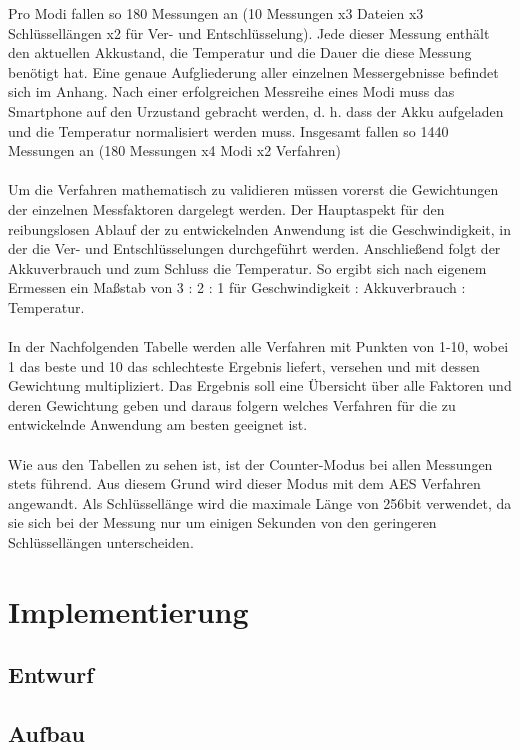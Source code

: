 \documentclass[10pt, a4paper]{scrreprt}
\begin{document}
Pro Modi fallen so 180 Messungen an (10 Messungen x3 Dateien x3 Schlüssellängen x2 für Ver- und Entschlüsselung). Jede dieser Messung enthält den aktuellen Akkustand, die Temperatur und die Dauer die diese Messung benötigt hat. Eine genaue Aufgliederung aller einzelnen Messergebnisse befindet sich im Anhang. Nach einer erfolgreichen Messreihe eines Modi muss das Smartphone auf den Urzustand gebracht werden, d. h. dass der Akku aufgeladen und die Temperatur normalisiert werden muss. Insgesamt fallen so 1440 Messungen an (180 Messungen x4 Modi x2 Verfahren)\\ \\
Um die Verfahren mathematisch zu validieren müssen vorerst die Gewichtungen der einzelnen Messfaktoren dargelegt werden. Der Hauptaspekt für den reibungslosen Ablauf der zu entwickelnden Anwendung ist die Geschwindigkeit, in der die Ver- und Entschlüsselungen durchgeführt werden. Anschließend folgt der Akkuverbrauch und zum Schluss die Temperatur. So ergibt sich nach eigenem Ermessen ein Maßstab von 3 : 2 : 1 für Geschwindigkeit : Akkuverbrauch : Temperatur. \\ \\
In der Nachfolgenden Tabelle werden alle Verfahren mit Punkten von 1-10, wobei 1 das beste und 10 das schlechteste Ergebnis liefert, versehen und mit dessen Gewichtung multipliziert. Das Ergebnis soll eine Übersicht über alle Faktoren und deren Gewichtung geben und daraus folgern welches Verfahren für die zu entwickelnde Anwendung am besten geeignet ist. \\ \\
Wie aus den Tabellen zu sehen ist, ist der Counter-Modus bei allen Messungen stets führend. Aus diesem Grund wird dieser Modus mit dem AES Verfahren angewandt. Als Schlüssellänge wird die maximale Länge von 256bit verwendet, da sie sich bei der Messung nur um einigen Sekunden von den geringeren Schlüssellängen unterscheiden.

\chapter{Implementierung}
\section{Entwurf}
\section{Aufbau}
\end{document}
